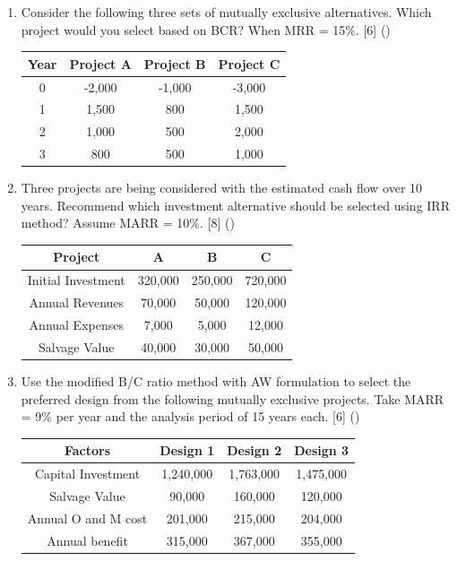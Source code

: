 \documentclass[12pt]{article}
\begin{document}
\begin{enumerate}
			\item Consider the following three sets of mutually exclusive alternatives. Which project would you select based on BCR? When MRR = 15\%. \hfill [6] ()\\
			\begin{tabular}{|c|c|c|c|}
				\hline
				Year & Project A & Project B & Project C \\ \hline
				0 & -2,000 & -1,000 & -3,000 \\ \hline
				1 & 1,500 & 800 & 1,500 \\ \hline
				2 & 1,000 & 500 & 2,000 \\ \hline
				3 & 800 & 500 & 1,000 \\ \hline
			\end{tabular}
			
			\item Three projects are being considered with the estimated cash flow over 10 years. Recommend which investment alternative should be selected using IRR method? Assume MARR = 10\%. \hfill [8] ()\\
			\begin{tabular}{|c|c|c|c|}
				\hline
				Project & A & B & C \\ \hline
				Initial Investment & 320,000 & 250,000 & 720,000 \\ \hline
				Annual Revenues & 70,000 & 50,000 & 120,000 \\ \hline
				Annual Expenses & 7,000 & 5,000 & 12,000 \\ \hline
				Salvage Value & 40,000 & 30,000 & 50,000 \\ \hline
			\end{tabular}
			
			\item Use the modified B/C ratio method with AW formulation to select the preferred design from the following mutually exclusive projects. Take MARR = 9\% per year and the analysis period of 15 years each. \hfill [6] ()\\
			\begin{tabular}{|c|c|c|c|}
				\hline
				Factors & Design 1 & Design 2 & Design 3 \\ \hline
				Capital Investment & 1,240,000 & 1,763,000 & 1,475,000 \\ \hline
				Salvage Value & 90,000 & 160,000 & 120,000 \\ \hline
				Annual O and M cost & 201,000 & 215,000 & 204,000 \\ \hline
				Annual benefit & 315,000 & 367,000 & 355,000 \\ \hline
			\end{tabular}
			

\end{enumerate}
\end{document}
